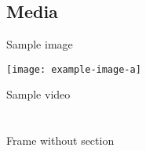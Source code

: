 \documentclass[aspectratio=169]{beamer} %
\begin{document}
\subsection{Media}

\begin{frame}
    {Sample image}
    \begin{center}
        \texttt{[image: example-image-a]}
    \end{center}
\end{frame}

\begin{frame}
    {Sample video}
    \begin{center}
    \end{center}
\end{frame}

\section*{}
\begin{frame}
    Frame without section
\end{frame}
\end{document}

